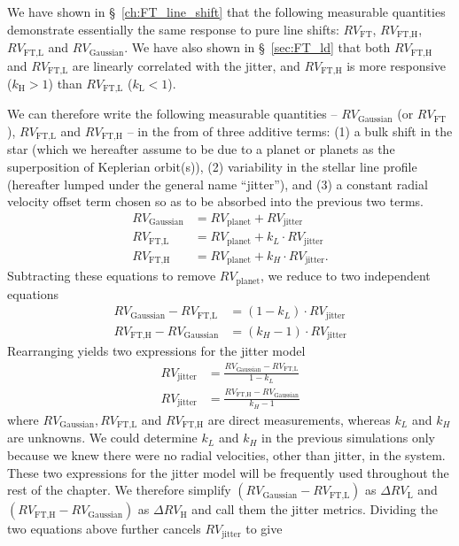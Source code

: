 We have shown in \S~\ref{ch:FT_line_shift} that the following measurable quantities demonstrate essentially the same response to pure line shifts: $RV_\text{FT}$, $RV_\text{FT,H}$, $RV_\text{FT,L}$ and $RV_\text{Gaussian}$. We have also shown in \S~\ref{sec:FT_ld} that both $RV_\text{FT,H}$ and $RV_\text{FT,L}$ are linearly correlated with the jitter, and $RV_\text{FT,H}$ is more responsive ($k_\text{H}>1$) than $RV_\text{FT,L}$ ($k_\text{L}<1$). 

We can therefore write the following measurable quantities -- $RV_\text{Gaussian}$ (or $RV_\text{FT}$), $RV_\text{FT,L}$ and $RV_\text{FT,H}$ -- in the from of three additive terms: (1) a bulk shift in the star (which we hereafter assume to be due to a planet or planets as the superposition of Keplerian orbit(s)), (2) variability in the stellar line profile (hereafter lumped under the general name ``jitter''), and (3) a constant radial velocity offset term chosen so as to be absorbed into the previous two terms.
\begin{align}
	RV_\text{Gaussian} 	&= RV_\text{planet} + RV_\text{jitter}				 \label{eq:RV_Gau} \\
	RV_\text{FT,L} 		&= RV_\text{planet} + k_L \cdot RV_\text{jitter} 		 \label{eq:RV_FTL} \\
	RV_\text{FT,H} 		&= RV_\text{planet} + k_H \cdot RV_\text{jitter}.		 \label{eq:RV_FTH}
\end{align}
Subtracting these equations to remove $RV_\text{planet}$, we reduce to two independent equations
\begin{align}
	RV_\text{Gaussian} - RV_\text{FT,L} 	&= (1-k_L) \cdot RV_\text{jitter}\\
	RV_\text{FT,H} - RV_\text{Gaussian}	&= (k_H-1) \cdot RV_\text{jitter}
\end{align}
Rearranging yields two expressions for the jitter model
\begin{align}
	RV_\text{jitter} &= \frac{RV_\text{Gaussian} - RV_\text{FT,L}}{1-k_L} 	\label{eq:jitter_model1} \\
	RV_\text{jitter} &= \frac{RV_\text{FT,H} - RV_\text{Gaussian}}{k_H-1}		\label{eq:jitter_model2} 
\end{align}
where $RV_\text{Gaussian}, RV_\text{FT,L}$ and $RV_\text{FT,H}$ are direct measurements, whereas $k_L$ and $k_H$ are unknowns. We could determine $k_L$ and $k_H$ in the previous simulations only because we knew there were no radial velocities, other than jitter, in the system. These two expressions for the jitter model will be frequently used throughout the rest of the chapter. We therefore simplify $(RV_\text{Gaussian} - RV_\text{FT,L})$ as $\Delta RV_\text{L}$ and $(RV_\text{FT,H} - RV_\text{Gaussian})$ as $\Delta RV_\text{H}$ and call them the jitter metrics. Dividing the two equations above further cancels $RV_\text{jitter}$ to give
